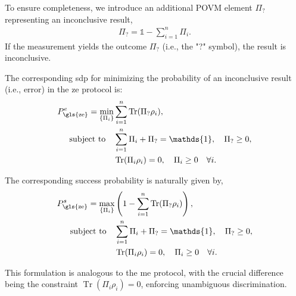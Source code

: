 \documentclass[12pt,letterpaper]{article}
\DeclareMathOperator{\tr}{Tr}
\begin{document}
\begin{multicols}{2}
To ensure completeness, we introduce an additional POVM element $\Pi_?$ representing an inconclusive result,
\begin{align*}
\Pi_? = \mathds{1} - \sum_{i=1}^n \Pi_i.
\end{align*}
If the measurement yields the outcome $\Pi_?$ (i.e., the "?" symbol), the result is inconclusive.

The corresponding \gls{sdp} for minimizing the probability of an inconclusive result (i.e., error) in the \gls{ze} protocol is:
\begin{align*}
	P_{\text{\gls{ze}}}^e = \min_{\left\{\Pi_i\right\}} &\sum_{i=1}^n \tr(\Pi_? \rho_i),\\
	\text{subject to} \quad & \sum_{i=1}^n \Pi_i + \Pi_? = \mathds{1}, \quad \Pi_? \geq 0,\\
	& \tr(\Pi_i \rho_i) = 0, \quad \Pi_i \geq 0 \quad \forall i.
\end{align*}

The corresponding success probability is naturally given by,
\begin{align*}
	P_{\text{\gls{ze}}}^s = \max_{\left\{\Pi_i\right\}} &\left(1 - \sum_{i=1}^n \tr(\Pi_? \rho_i)\right),\\
	\text{subject to} \quad & \sum_{i=1}^n \Pi_i + \Pi_? = \mathds{1}, \quad \Pi_? \geq 0,\\
	& \tr(\Pi_i \rho_i) = 0, \quad \Pi_i \geq 0 \quad \forall i.
\end{align*}

This formulation is analogous to the \gls{me} protocol, with the crucial difference being the constraint $\tr(\Pi_i \rho_i) = 0$, enforcing unambiguous discrimination.


\end{multicols}
\end{document}
